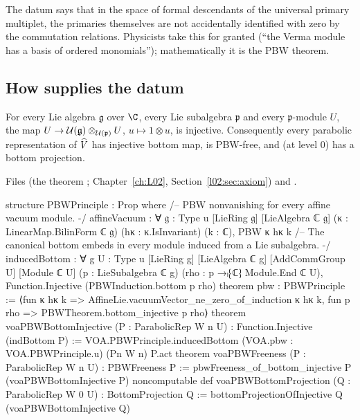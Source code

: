 \begin{physics}
The datum says that in the space of formal descendants of the universal primary multiplet, the primaries themselves are
not accidentally identified with zero by the commutation relations. Physicists take this for granted (``the Verma module
has a basis of ordered monomials''); mathematically it is the PBW theorem.
\end{physics}

\subsection{How \texorpdfstring{}{VOA.pbw} supplies the datum}

\begin{theorem}\label{l13:thm:voapbw}
For every Lie algebra $\mathfrak g$ over $\C$, every Lie subalgebra $\mathfrak p$ and every $\mathfrak p$-module $U$, the map
$U\to\mathcal{U}(\mathfrak g)\otimes_{\mathcal{U}(\mathfrak p)}U$, $u\mapsto1\otimes u$, is injective. Consequently every
parabolic representation of $\widehat{V}$ has injective bottom map, is PBW-free, and (at level $0$) has a bottom projection.
\end{theorem}
\noindent Files  (the theorem ; Chapter~\ref{ch:L02},
Section~\ref{l02:sec:axiom}) and .
\begin{leancode}
structure PBWPrinciple : Prop where
  /-- PBW nonvanishing for every affine vacuum module. -/
  affineVacuum : ∀ {𝔤 : Type u} [LieRing 𝔤] [LieAlgebra ℂ 𝔤]
      (κ : LinearMap.BilinForm ℂ 𝔤) (hκ : κ.IsInvariant) (k : ℂ),
    PBW κ hκ k
  /-- The canonical bottom embeds in every module induced from a Lie subalgebra. -/
  inducedBottom : ∀ {g U : Type u} [LieRing g] [LieAlgebra ℂ g]
      [AddCommGroup U] [Module ℂ U] (p : LieSubalgebra ℂ g)
      (rho : p →ₗ⁅ℂ⁆ Module.End ℂ U),
    Function.Injective (PBWInduction.bottom p rho)
theorem pbw : PBWPrinciple :=
  ⟨fun κ hκ k => AffineLie.vacuumVector_ne_zero_of_induction κ hκ k,
    fun p rho => PBWTheorem.bottom_injective p rho⟩
theorem voaPBWBottomInjective (P : ParabolicRep W n U) :
    Function.Injective (indBottom P) :=
  VOA.PBWPrinciple.inducedBottom
    (VOA.pbw : VOA.PBWPrinciple.{u}) (Pn W n) P.act
theorem voaPBWFreeness (P : ParabolicRep W n U) : PBWFreeness P :=
  pbwFreeness_of_bottom_injective P (voaPBWBottomInjective P)
noncomputable def voaPBWBottomProjection (Q : ParabolicRep W 0 U) : BottomProjection Q :=
  bottomProjectionOfInjective Q (voaPBWBottomInjective Q)
\end{leancode}

